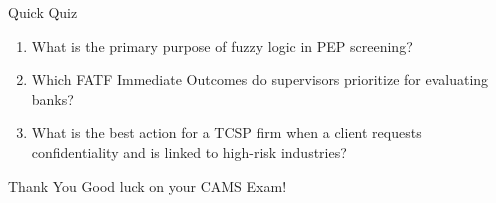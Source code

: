 \documentclass{beamer}
\begin{document}
	\begin{frame}{Quick Quiz}
		\begin{enumerate}
			\item What is the primary purpose of fuzzy logic in PEP screening?
			\item Which FATF Immediate Outcomes do supervisors prioritize for evaluating banks?
			\item What is the best action for a TCSP firm when a client requests confidentiality and is linked to high-risk industries?
		\end{enumerate}
	\end{frame}
	
	\begin{frame}
		\begin{center}
			\Huge Thank You
			\vspace{1cm}
			\Large Good luck on your CAMS Exam!
		\end{center}
	\end{frame}
	
\end{document}
